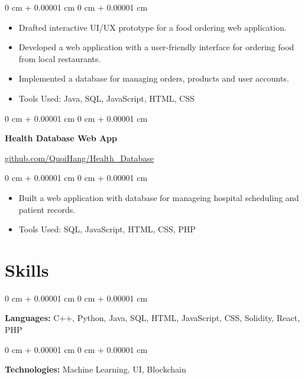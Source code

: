 \documentclass[10pt, letterpaper]{article}
\newenvironment{highlights}{
    \begin{itemize}[
        topsep=0.10 cm,
        parsep=0.10 cm,
        partopsep=0pt,
        itemsep=0pt,
        leftmargin=0 cm + 10pt
    ]
}{
    \end{itemize}
} %
\newenvironment{onecolentry}{
    \begin{adjustwidth}{
        0 cm + 0.00001 cm
    }{
        0 cm + 0.00001 cm
    }
}{
    \end{adjustwidth}
} %
\newenvironment{twocolentry}[2][]{
    \onecolentry
    \def\secondColumn{#2}
    \setcolumnwidth{\fill, 6.5 cm}
    \begin{paracol}{2}
}{
    \switchcolumn \raggedleft \secondColumn
    \end{paracol}
    \endonecolentry
} %
\begin{document}
        \vspace{0.10 cm}
        \begin{onecolentry}
            \begin{highlights}
                \item Drafted interactive UI/UX prototype for a food ordering web application.
                \item Developed a web application with a user-friendly interface for ordering food from local restaurants.
                \item Implemented a database for managing orders, products and user accounts.
                \item Tools Used: Java, SQL, JavaScript, HTML, CSS
            \end{highlights}
        \end{onecolentry}


        \vspace{0.2 cm}

        \begin{twocolentry}{
            \href{https://github.com/QuoiHang/Health_Database}{github.com/QuoiHang/Health\_Database}
        }
            \textbf{Health Database Web App}
        \end{twocolentry}


        \vspace{0.10 cm}
        \begin{onecolentry}
            \begin{highlights}
                \item Built a web application with database for manageing hospital scheduling and patient records.
                \item Tools Used: SQL, JavaScript, HTML, CSS, PHP
            \end{highlights}
        \end{onecolentry}

    
    \section{Skills}
        \begin{onecolentry}
            \textbf{Languages:} C++, Python, Java, SQL, HTML, JavaScript, CSS, Solidity, React, PHP
        \end{onecolentry}

        \vspace{0.2 cm}

        \begin{onecolentry}
            \textbf{Technologies:} Machine Learning, UI, Blockchain
        \end{onecolentry}
\end{document}
